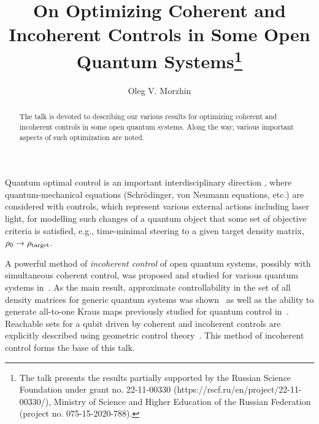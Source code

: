 \documentclass[12pt]{llncs}
\begin{document}
\fi

\title{On Optimizing Coherent and Incoherent Controls in 
Some Open Quantum Systems\thanks{The talk presents the results partially supported by the Russian Science Foundation under grant no. 22-11-00330 (https://rscf.ru/en/project/22-11-00330/), 
Ministry of Science and Higher Education of the Russian Federation (project no. 075-15-2020-788).}} 

\author{Oleg V. Morzhin 
}

\maketitle

\begin{abstract}
The talk is devoted to describing our various results for optimizing 
coherent and incoherent controls in some open quantum systems. 
Along the way, various important aspects of such optimization are noted. 


\sloppy

\end{abstract}

Quantum optimal control is an important interdisciplinary direction 
\cite{ccMoore2011,ccKoch_arXiv2022,ccDAlessandroBook2021,ccMorzhinRMS2019,ccMIPTCourseQCS}, 
where quantum-mechanical equations (Schr\"{o}dinger, von Neumann equations, etc.) 
are considered with controls, which represent various external actions including
laser light, for modelling such changes of a quantum object 
that some set of objective criteria is satisfied, e.g., time-minimal
steering to a given target density matrix, $\rho_0 \to \rho_{\rm target}$. 

A powerful method of {\it incoherent control} of open quantum systems, possibly with simultaneous
coherent control, was proposed and studied for various quantum systems in~\cite{ccPechenPRA2006,ccPechenPRA2011}. As the main result, approximate controllability in the set of all density matrices for generic quantum systems was shown~\cite{ccPechenPRA2011} as well as the ability to generate all-to-one Kraus maps previously studied for quantum control in~\cite{ccWuJPA2007}. Reachable sets for a qubit driven by coherent and incoherent controls are explicitly described using geometric control theory~\cite{ccLokutsievskiyJPA2021}. This method of incoherent control forms the base of this talk. 
\end{document}
